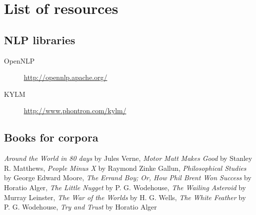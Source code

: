 \section{List of resources}
\subsection*{NLP libraries}
\label{sec:resources}
\begin{description}
\item[OpenNLP]{\url{http://opennlp.apache.org/}}
\item[KYLM]{\url{http://www.phontron.com/kylm/}}
\end{description}
\subsection*{Books for corpora} 
\emph{Around the World in 80 days} by Jules Verne, \emph{Motor Matt Makes Good} by Stanley R. Matthews, \emph{People Minus X} by Raymond Zinke Gallun, \emph{Philosophical Studies} by George Edward Moore, \emph{The Errand Boy; Or, How Phil Brent Won Success} by Horatio Alger, \emph{The Little Nugget} by P. G. Wodehouse, \emph{The Wailing Asteroid} by Murray Leinster, \emph{The War of the Worlds} by H. G. Wells, \emph{The White Feather} by P. G. Wodehouse, \emph{Try and Trust} by Horatio Alger